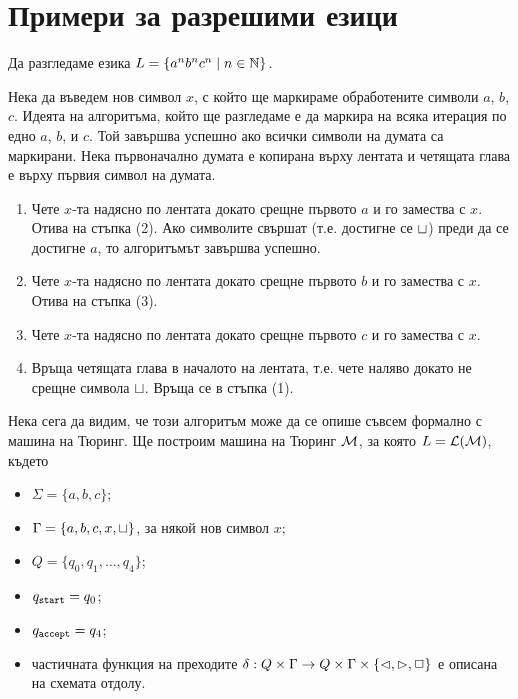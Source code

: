 \section{Примери за разрешими езици}

\begin{example}
  Да разгледаме езика $L = \{a^nb^nc^n \mid n\in\mathbb{N}\}$.
 
  Нека да въведем нов символ $x$, с който ще маркираме обработените символи $a$, $b$, $c$.
  Идеята на алгоритъма, който ще разгледаме е да маркира на всяка итерация по едно $a$, $b$, и $c$.
  Той завършва успешно ако всички символи на думата са маркирани.
  Нека първоначално думата е копирана върху лентата и четящата глава е върху първия символ на думата.
  \begin{enumerate}[(1)]
  \item 
    Чете $x$-та надясно по лентата докато срещне първото $a$ и го замества с $x$. Отива на стъпка (2).
    Ако символите свършат (т.е. достигне се $\sqcup$) преди да се достигне $a$,
    то алгоритъмът завършва успешно.
  \item
    Чете $x$-та надясно по лентата докато срещне първото $b$ и го замества с $x$.
    Отива на стъпка (3).
  \item
    Чете $x$-та надясно по лентата докато срещне първото $c$ и го замества с $x$.
  \item
    Връща четящата глава в началото на лентата, т.е. чете наляво докато не срещне символа $\sqcup$.
    Връща се в стъпка (1). 
  \end{enumerate}

  Нека сега да видим, че този алгоритъм може да се опише съвсем формално с машина на Тюринг.
  Ще построим машина на Тюринг $\mathcal{M}$, за която $L = \mathcal{L}(\mathcal{M})$, където
  \begin{itemize}
  \item 
    $\Sigma = \{a,b,c\}$;
  \item
    $\Gamma = \{a,b,c,x,\sqcup\}$, за някой нов символ $x$;
  \item
    $Q = \{q_0,q_1,\dots,q_4\}$;
  \item
    $q_{\texttt{start}} = q_0$;
  \item
    $q_{\texttt{accept}} = q_4$;
  \item
    частичната функция на преходите $\delta:Q\times\Gamma \to Q\times\Gamma\times\{\lhd,\rhd,\Box\}$
    е описана на схемата отдолу.
  \end{itemize}


\end{example}

